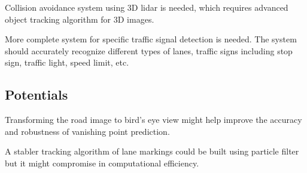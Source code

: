 \documentclass[11pt, oneside]{article}
\begin{document}
Collision avoidance system using 3D lidar is needed, which requires advanced object tracking algorithm for 3D images. 

More complete system for specific traffic signal detection is needed. The system should accurately recognize different types of lanes, traffic signs including stop sign, traffic light, speed limit, etc. 

\subsection*{Potentials}

Transforming the road image to bird's eye view might help improve the accuracy and robustness of vanishing point prediction. 

A stabler tracking algorithm of lane markings could be built using particle filter but it might compromise in computational efficiency. 








\end{document}
